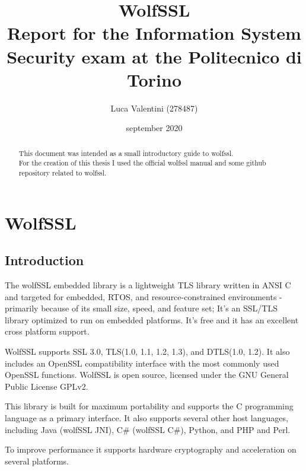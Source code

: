 \documentclass[a4paper,12pt]{article}
\begin{document}
\title{WolfSSL
\\
{\normalsize Report for the Information System Security exam at the Politecnico di Torino}
}
\author{Luca Valentini (278487)
\\
}
\date{september 2020}


\maketitle
\tableofcontents


\newpage
\begin{abstract}
This document was intended as a small introductory guide to wolfssl.
\\For the creation of this thesis I used the official wolfssl manual and some github repository related to wolfssl.
\end{abstract}
\newpage



\section{WolfSSL}
\subsection{Introduction}

The wolfSSL embedded library is a lightweight TLS library written in ANSI C and targeted for embedded, RTOS, and resource-constrained
environments - primarily because of its small size, speed, and feature set; It's an SSL/TLS library optimized to run on embedded platforms.
It's free and it has an excellent cross platform support.

WolfSSL supports SSL 3.0, TLS(1.0, 1.1, 1.2, 1.3), and DTLS(1.0, 1.2).
It also includes an OpenSSL compatibility interface with the most commonly used OpenSSL functions.
WolfSSL is open source, licensed under the GNU General Public License GPLv2.

This library is built for maximum portability and supports the C programming language as a primary interface. It also supports several other host languages, including Java (wolfSSL JNI), C\# (wolfSSL C\#), Python, and PHP and Perl.

To improve performance it supports hardware cryptography and acceleration on several platforms.
\end{document}
